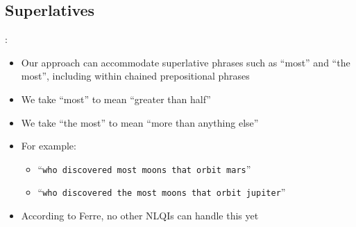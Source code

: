 \documentclass[logoontitle,tabu,supertabular,aspectratio=43]{preney-uwindsor-beamer}
\begin{document}
    \subsection{Superlatives}
    \begin{frame}{\insertsection: \insertsubsection}
        \begin{itemize}
            \item Our approach can accommodate superlative phrases such as ``most'' and ``the most'', including within chained prepositional phrases
            \item We take ``most'' to mean ``greater than half''
            \item We take ``the most'' to mean ``more than anything else''
            \item For example:
            \begin{itemize}
                \item ``\texttt{who discovered most moons that orbit mars}''
                \item ``\texttt{who discovered the most moons that orbit jupiter}''
            \end{itemize}
            \item According to Ferre, no other NLQIs can handle this yet
        \end{itemize}
    \end{frame}

    \newcommand\biapply{\ensuremath{\mathbin{\ll\mkern-8mu*\mkern-8mu\gg}}}
\end{document}
